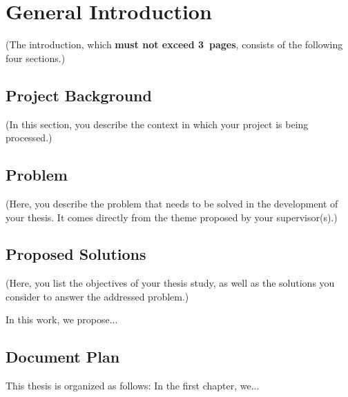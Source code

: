 \chapter*{General Introduction} 
\label{chap:introduction} 

(The introduction, which \textbf{must not exceed 3~pages}, consists of the following four sections.)

\section*{Project Background}
(In this section, you describe the context in which your project is being processed.)

\section*{Problem}
(Here, you describe the problem that needs to be solved in the development of your thesis. It comes directly from the theme proposed by your supervisor(s).)

\section*{Proposed Solutions}
(Here, you list the objectives of your thesis study, as well as the solutions you consider to answer the addressed problem.)

In this work, we propose...

\section*{Document Plan}
This thesis is organized as follows: In the first chapter, we...
